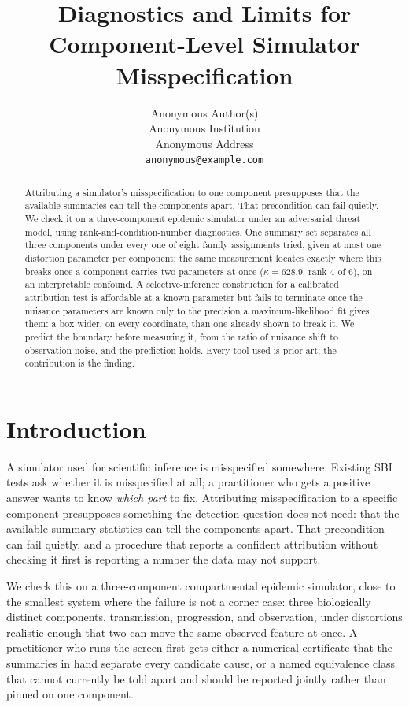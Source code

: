 \documentclass{article}
\title{Diagnostics and Limits for Component-Level Simulator Misspecification}
\author{%
  Anonymous Author(s) \\
  Anonymous Institution \\
  Anonymous Address \\
  \texttt{anonymous@example.com} \\
}
\begin{document}
\maketitle

\begin{abstract}
Attributing a simulator's misspecification to one component presupposes that the available
summaries can tell the components apart. That precondition can fail quietly. We check it on
a three-component epidemic simulator under an adversarial threat model, using
rank-and-condition-number diagnostics. One summary set separates all three components under
every one of eight family assignments tried, given at most one distortion parameter per
component; the same measurement locates exactly where this breaks once a component carries two
parameters at once ($\kappa=628.9$, rank 4 of 6), on an interpretable confound. A
selective-inference construction for a calibrated attribution test is affordable at a known
parameter but fails to terminate once the nuisance parameters are known only to the precision a
maximum-likelihood fit gives them: a box wider, on every coordinate, than one already shown to
break it. We predict the boundary before measuring it, from the ratio of nuisance shift to
observation noise, and the prediction holds.
Every tool used is prior art; the contribution is the finding.
\end{abstract}

\section{Introduction}
\label{sec:intro}

A simulator used for scientific inference is misspecified somewhere.
Existing SBI tests ask whether it is misspecified at all; a practitioner who gets a positive
answer wants to know \emph{which part} to fix. Attributing misspecification to a
specific component presupposes something the detection question does not need: that the
available summary statistics can tell the components apart. That precondition can fail
quietly, and a procedure that reports a confident attribution without checking it first is
reporting a number the data may not support.

We check this on a three-component compartmental epidemic simulator, close to the smallest
system where the failure is not a corner case: three biologically distinct components,
transmission, progression, and observation, under distortions realistic enough that two can move
the same observed feature at once. A practitioner who runs the screen first gets either a
numerical certificate that the summaries in hand separate every candidate cause, or a named
equivalence class that cannot currently be told apart and should be reported jointly rather than
pinned on one component.
\end{document}
